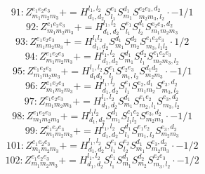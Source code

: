 \documentclass[letterpaper,10pt,fleqn,leqno,onecolumn]{article}
\begin{document}
\begin{equation} \;\;\;\;\;\;  91: Z^{e_{1}e_{2}e_{3}}_{m_{1}m_{2}m_{3}}+=H^{l_{1},l_{2}}_{d_{1},d_{2}}S^{e_{1}}_{l_{1}}S^{d_{1}}_{m_{1}}S^{e_{2}e_{3},d_{2}}_{m_{2}m_{3},l_{2}}\cdot -1/1 \end{equation}
\begin{equation} \;\;\;\;\;\;  92: Z^{e_{1}e_{2}e_{3}}_{m_{1}m_{2}m_{3}}+=H^{l_{1},l_{2}}_{d_{1},d_{2}}S^{e_{1}}_{l_{1}}S^{d_{1}}_{l_{2}}S^{e_{2}e_{3},d_{2}}_{m_{1}m_{2}m_{3}} \end{equation}
\begin{equation} \;\;\;\;\;\;  93: Z^{e_{1}e_{2}e_{3}}_{m_{1}m_{2}m_{3}}+=H^{l_{1}l_{2}}_{d_{1},d_{2}}S^{d_{1}}_{m_{1}}S^{d_{2}}_{m_{2}}S^{e_{1}e_{2}e_{3}}_{m_{3},l_{1}l_{2}}\cdot 1/2 \end{equation}
\begin{equation} \;\;\;\;\;\;  94: Z^{e_{1}e_{2}e_{3}}_{m_{1}m_{2}m_{3}}+=H^{l_{1},l_{2}}_{d_{1},d_{2}}S^{d_{1}}_{m_{1}}S^{d_{2}}_{l_{1}}S^{e_{1}e_{2}e_{3}}_{m_{2}m_{3},l_{2}} \end{equation}
\begin{equation} \;\;\;\;\;\;  95: Z^{e_{1}e_{2}e_{3}}_{m_{1}m_{2}m_{3}}+=H^{l_{1},l_{2}}_{d_{1}d_{2}}S^{e_{1}}_{l_{1}}S^{e_{2}e_{3}}_{m_{1},l_{2}}S^{d_{1}d_{2}}_{m_{2}m_{3}}\cdot -1/1 \end{equation}
\begin{equation} \;\;\;\;\;\;  96: Z^{e_{1}e_{2}e_{3}}_{m_{1}m_{2}m_{3}}+=H^{l_{1},l_{2}}_{d_{1},d_{2}}S^{e_{1}}_{l_{1}}S^{e_{2},d_{1}}_{m_{1}m_{2}}S^{e_{3},d_{2}}_{m_{3},l_{2}} \end{equation}
\begin{equation} \;\;\;\;\;\;  97: Z^{e_{1}e_{2}e_{3}}_{m_{1}m_{2}m_{3}}+=H^{l_{1},l_{2}}_{d_{1},d_{2}}S^{d_{1}}_{m_{1}}S^{e_{1}e_{2}}_{m_{2},l_{1}}S^{e_{3},d_{2}}_{m_{3},l_{2}} \end{equation}
\begin{equation} \;\;\;\;\;\;  98: Z^{e_{1}e_{2}e_{3}}_{m_{1}m_{2}m_{3}}+=H^{l_{1}l_{2}}_{d_{1},d_{2}}S^{d_{1}}_{m_{1}}S^{e_{1}e_{2}}_{l_{1}l_{2}}S^{e_{3},d_{2}}_{m_{2}m_{3}}\cdot -1/1 \end{equation}
\begin{equation} \;\;\;\;\;\;  99: Z^{e_{1}e_{2}e_{3}}_{m_{1}m_{2}m_{3}}+=H^{l_{1},l_{2}}_{d_{1},d_{2}}S^{d_{1}}_{l_{1}}S^{e_{1}e_{2}}_{m_{1},l_{2}}S^{e_{3},d_{2}}_{m_{2}m_{3}} \end{equation}
\begin{equation} \;\;\;\;\;\;  101: Z^{e_{1}e_{2}e_{3}}_{m_{1}m_{2}m_{3}}+=H^{l_{1},l_{2}}_{d_{1},d_{2}}S^{e_{1}}_{l_{1}}S^{e_{2}}_{l_{2}}S^{d_{1}}_{m_{1}}S^{e_{3},d_{2}}_{m_{2}m_{3}}\cdot -1/2 \end{equation}
\begin{equation} \;\;\;\;\;\;  102: Z^{e_{1}e_{2}e_{3}}_{m_{1}m_{2}m_{3}}+=H^{l_{1},l_{2}}_{d_{1},d_{2}}S^{e_{1}}_{l_{1}}S^{d_{1}}_{m_{1}}S^{d_{2}}_{m_{2}}S^{e_{2}e_{3}}_{m_{3},l_{2}}\cdot -1/2 \end{equation}
\end{document}

